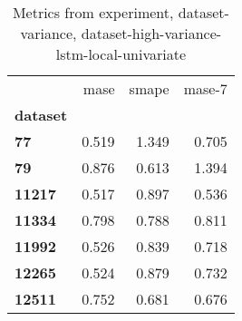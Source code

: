 \begin{table}[h]
\centering
\caption{Metrics from experiment, dataset-variance, dataset-high-variance-lstm-local-univariate}
\label{table:dataset-high-variance-lstm-local-univariate-dataset-variance}
\begin{tabular}{lrrr}
\toprule
{} &   mase &  smape &  mase-7 \\
\textbf{dataset} &        &        &         \\
\midrule
\textbf{77     } &  0.519 &  1.349 &   0.705 \\
\textbf{79     } &  0.876 &  0.613 &   1.394 \\
\textbf{11217  } &  0.517 &  0.897 &   0.536 \\
\textbf{11334  } &  0.798 &  0.788 &   0.811 \\
\textbf{11992  } &  0.526 &  0.839 &   0.718 \\
\textbf{12265  } &  0.524 &  0.879 &   0.732 \\
\textbf{12511  } &  0.752 &  0.681 &   0.676 \\
\bottomrule
\end{tabular}
\end{table}
